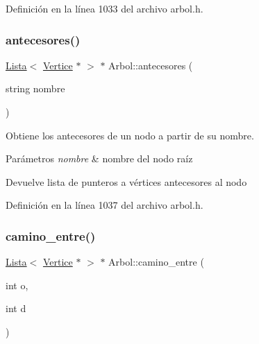 Definición en la línea 1033 del archivo arbol.\+h.

\mbox{\label{classArbol_aa975d5d9cf5fcfc392a8200bd0078d1c}} 
\subsubsection{\texorpdfstring{antecesores()}{antecesores()}\hspace{0.1cm}{\footnotesize\ttfamily [2/2]}}
{\footnotesize\ttfamily \hyperlink{classLista}{Lista}$<$ \hyperlink{classVertice}{Vertice} $\ast$ $>$ $\ast$ Arbol\+::antecesores (\begin{DoxyParamCaption}\item[{string}]{nombre }\end{DoxyParamCaption})}



Obtiene los antecesores de un nodo a partir de su nombre. 


\begin{DoxyParams}{Parámetros}
{\em nombre} & nombre del nodo raíz \\
\hline
\end{DoxyParams}
\begin{DoxyReturn}{Devuelve}
lista de punteros a vértices antecesores al nodo 
\end{DoxyReturn}


Definición en la línea 1037 del archivo arbol.\+h.

\mbox{\label{classArbol_accfa606c5f5e67b6ab18c4490075cf39}} 
\subsubsection{\texorpdfstring{camino\+\_\+entre()}{camino\_entre()}\hspace{0.1cm}{\footnotesize\ttfamily [1/2]}}
{\footnotesize\ttfamily \hyperlink{classLista}{Lista}$<$ \hyperlink{classVertice}{Vertice} $\ast$ $>$ $\ast$ Arbol\+::camino\+\_\+entre (\begin{DoxyParamCaption}\item[{int}]{o,  }\item[{int}]{d }\end{DoxyParamCaption})}



